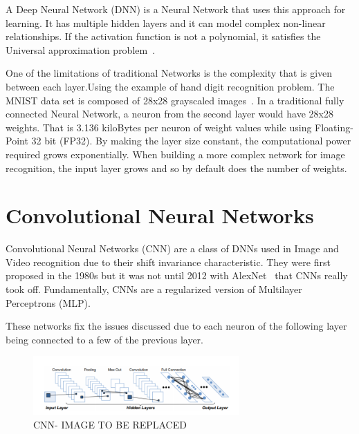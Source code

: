  A Deep Neural Network (DNN) is a Neural Network that uses this approach for learning. It has multiple hidden layers and it can 
 model complex non-linear relationships. If the activation function is not a polynomial, it satisfies
 the Universal approximation problem~\cite{approximation:problem}.

One of the limitations of traditional Networks is the complexity that is given between each layer.Using the example of hand digit recognition problem.
The MNIST data set is composed of 28x28 grayscaled images~\cite{mnist:digits}. In a traditional fully connected Neural Network, a neuron from the second layer
would have 28x28 weights. That is 3.136 kiloBytes per neuron of weight values while using Floating-Point 32 bit (FP32). 
By making the layer size constant, the computational power required grows exponentially.
When building a more complex network for image recognition, the input layer grows and so by default does the number of weights.



 \section{Convolutional Neural Networks}
 \label{section:subcnn}

 \quad Convolutional Neural Networks (CNN) are a class of DNNs used in Image and Video recognition due to their shift invariance characteristic. They were first proposed in the 
 1980s but it was not until 2012 with AlexNet~\cite{alexnet} 
 that CNNs really took off. Fundamentally, CNNs are a regularized version of Multilayer Perceptrons (MLP).

 These networks fix the issues discussed due to each neuron of the following layer being connected to a few of the previous layer.
 

 \begin{figure}[!htbp]
    \centering
    \includegraphics[width=0.7\textwidth]{Figures/convolutionlayer.png}
    \caption{CNN- IMAGE TO BE REPLACED}
    \label{CNNl}
\end{figure} 

